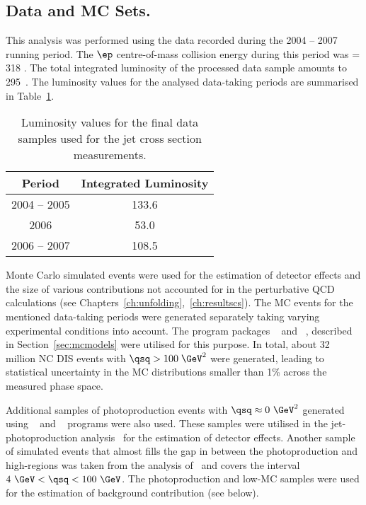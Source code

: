 \subsection{Data and MC Sets.}
This analysis was performed using the data recorded during the 2004 -- 2007 \hera running period. The $\ep$ centre-of-mass collision energy during this period was \sqs = 318 \GeV. The total integrated luminosity of the processed data sample amounts to 295~\invpb. The luminosity values for the analysed data-taking periods are summarised in Table~\ref{tab:selecteddatasample}.

\begin{table}[htpb!]
	\centering
		\begin{tabular}[h]{c|c}
		  \hline
			Period & Integrated Luminosity \\
			\hline \hline
			2004 -- 2005  & 133.6 \invpb  \\
			2006             & 53.0 \invpb   \\
			2006 -- 2007  & 108.5 \invpb \\
			\hline
		\end{tabular}
	\caption{Luminosity values for the final data samples used for the jet cross section measurements.}
	\label{tab:selecteddatasample}
\end{table}

Monte Carlo simulated events were used for the estimation of detector effects and the size of various contributions not accounted for in the perturbative QCD calculations (see Chapters~\ref{ch:unfolding},~\ref{ch:resultscs}). The MC events for the mentioned data-taking periods were generated separately taking varying experimental conditions into account. The program packages \lepto~\cite{Ingelman:1996mq} and \ariadne~\cite{cpc:71:15,Lonnblad:1994wk}, described in Section~\ref{sec:mcmodels} were utilised for this purpose. In total, about 32 million NC DIS events with $\qsq > 100\;\GeV^2$ were generated, leading to statistical uncertainty in the MC distributions smaller than 1\% across the measured phase space. 

Additional samples of photoproduction events with $\qsq\approx 0~\GeV^2$ generated using \herwig~\cite{cpc:67:465, jhep01:2001:010} and \pythia~\cite{cpc:82:74} programs were also used. These samples were utilised in the jet-photoproduction analysis~\cite{np:b864:1} for the estimation of detector effects. Another sample of simulated events that almost fills the gap in \qsq between the photoproduction and high-\qsq regions was taken from the analysis of~\cite{thesis:perrey:2011} and covers the interval $4~\GeV<\qsq<100~\GeV$. The photoproduction and low-\qsq MC samples were used for the estimation of background contribution (see below).

